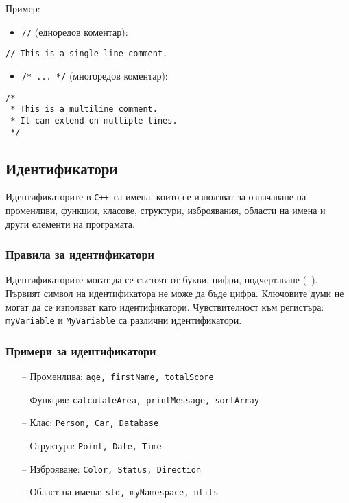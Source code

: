 \documentclass[oneside]{book}
\newcommand*{\code}[1]{\texttt{#1}}
\newcommand*{\cpp}{\texttt{C++}\ }
\begin{document}
Пример:
\begin{itemize}
    \item \code{//} (едноредов коментар):
\end{itemize}
\begin{mdframed}\begin{lstlisting}
// This is a single line comment.
\end{lstlisting}\end{mdframed}
\begin{itemize}
    \item \code{/* ... */} (многоредов коментар):
\end{itemize}
\begin{mdframed}\begin{lstlisting}
/*
 * This is a multiline comment.
 * It can extend on multiple lines.
 */
\end{lstlisting}\end{mdframed}

\subsection{Идентификатори}
Идентификаторите в \cpp са имена, които се използват за означаване на променливи, функции, класове, структури, изброявания, области на имена и други елементи на програмата.

\subsubsection{Правила за идентификатори}
Идентификаторите могат да се състоят от букви, цифри, подчертаване (\code{\_}). Първият символ на идентификатора не може да бъде цифра.
Ключовите думи не могат да се използват като идентификатори. Чувствителност към регистъра: \code{myVariable} и \code{MyVariable} са различни идентификатори.

\subsubsection{Примери за идентификатори}
\begin{itemize}
    \item[--] Променлива: \code{age, firstName, totalScore}
    \item[--] Функция: \code{calculateArea, printMessage, sortArray}
    \item[--] Клас: \code{Person, Car, Database}
    \item[--] Структура: \code{Point, Date, Time}
    \item[--] Изброяване: \code{Color, Status, Direction}
    \item[--] Област на имена: \code{std, myNamespace, utils}
\end{itemize}
\end{document}
